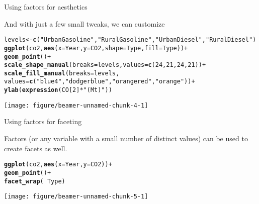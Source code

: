 \documentclass[table]{beamer}\usepackage[]{graphicx}\usepackage[]{color}
\makeatletter
\def\maxwidth{ %
  \ifdim\Gin@nat@width>\linewidth
    \linewidth
  \else
    \Gin@nat@width
  \fi
}
\newcommand{\hlnum}[1]{\textcolor[rgb]{0.686,0.059,0.569}{#1}}%
\newcommand{\hlstr}[1]{\textcolor[rgb]{0.192,0.494,0.8}{#1}}%
\newcommand{\hlopt}[1]{\textcolor[rgb]{0,0,0}{#1}}%
\newcommand{\hlstd}[1]{\textcolor[rgb]{0.345,0.345,0.345}{#1}}%
\newcommand{\hlkwb}[1]{\textcolor[rgb]{0.69,0.353,0.396}{#1}}%
\newcommand{\hlkwc}[1]{\textcolor[rgb]{0.333,0.667,0.333}{#1}}%
\newcommand{\hlkwd}[1]{\textcolor[rgb]{0.737,0.353,0.396}{\textbf{#1}}}%
\newenvironment{kframe}{%
 \def\at@end@of@kframe{}%
 \ifinner\ifhmode%
  \def\at@end@of@kframe{\end{minipage}}%
  \begin{minipage}{\columnwidth}%
 \fi\fi%
 \def\FrameCommand##1{\hskip\@totalleftmargin \hskip-\fboxsep
 \colorbox{shadecolor}{##1}\hskip-\fboxsep
     \hskip-\linewidth \hskip-\@totalleftmargin \hskip\columnwidth}%
 \MakeFramed {\advance\hsize-\width
   \@totalleftmargin\z@ \linewidth\hsize
   \@setminipage}}%
 {\par\unskip\endMakeFramed%
 \at@end@of@kframe}
\newenvironment{knitrout}{}{} %
\makeatother
\begin{document}

\begin{frame}[fragile]{Using factors for aesthetics}

And with just a few small tweaks, we can customize

\begin{knitrout}\tiny
{}\color{fgcolor}\begin{kframe}
\begin{alltt}
\hlstd{levels} \hlkwb{<-} \hlkwd{c}\hlstd{(}\hlstr{"Urban Gasoline"}\hlstd{,} \hlstr{"Rural Gasoline"}\hlstd{,} \hlstr{"Urban Diesel"}\hlstd{,} \hlstr{"Rural Diesel"}\hlstd{)}
\hlkwd{ggplot}\hlstd{(co2,} \hlkwd{aes}\hlstd{(}\hlkwc{x} \hlstd{= Year,} \hlkwc{y} \hlstd{= CO2,} \hlkwc{shape} \hlstd{= Type,} \hlkwc{fill} \hlstd{= Type))} \hlopt{+}
  \hlkwd{geom_point}\hlstd{()} \hlopt{+}
  \hlkwd{scale_shape_manual}\hlstd{(}\hlkwc{breaks}\hlstd{=levels,} \hlkwc{values}\hlstd{=}\hlkwd{c}\hlstd{(}\hlnum{24}\hlstd{,} \hlnum{21}\hlstd{,} \hlnum{24}\hlstd{,} \hlnum{21}\hlstd{))} \hlopt{+}
  \hlkwd{scale_fill_manual}\hlstd{(}\hlkwc{breaks} \hlstd{= levels,}
                    \hlkwc{values}\hlstd{=}\hlkwd{c}\hlstd{(}\hlstr{"blue4"}\hlstd{,} \hlstr{"dodgerblue"}\hlstd{,} \hlstr{"orangered"}\hlstd{,} \hlstr{"orange"}\hlstd{))} \hlopt{+}
  \hlkwd{ylab}\hlstd{(}\hlkwd{expression}\hlstd{(CO[}\hlnum{2}\hlstd{]}\hlopt{*}\hlstr{" (Mt)"}\hlstd{))}
\end{alltt}
\end{kframe}

{\centering \texttt{[image: figure/beamer-unnamed-chunk-4-1]} 

}



\end{knitrout}

\end{frame}


\begin{frame}[fragile]{Using factors for faceting}

Factors (or any variable with a small number of distinct values) can be used to create facets as well.

\begin{knitrout}\tiny
{}\color{fgcolor}\begin{kframe}
\begin{alltt}
\hlkwd{ggplot}\hlstd{(co2,} \hlkwd{aes}\hlstd{(}\hlkwc{x} \hlstd{= Year,} \hlkwc{y} \hlstd{= CO2))} \hlopt{+}
  \hlkwd{geom_point}\hlstd{()} \hlopt{+}
  \hlkwd{facet_wrap}\hlstd{(}\hlopt{~}\hlstd{Type)}
\end{alltt}
\end{kframe}

{\centering \texttt{[image: figure/beamer-unnamed-chunk-5-1]} 

}



\end{knitrout}

\end{frame}
\end{document}
